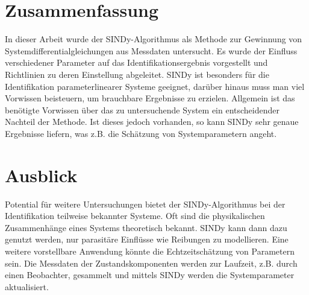 \section{Zusammenfassung}
In dieser Arbeit wurde der SINDy-Algorithmus als Methode zur Gewinnung von Systemdifferentialgleichungen aus Messdaten untersucht. Es wurde der Einfluss verschiedener Parameter auf das Identifikationsergebnis vorgestellt und Richtlinien zu deren Einstellung abgeleitet. SINDy ist besonders für die Identifikation parameterlinearer Systeme geeignet, darüber hinaus muss man viel Vorwissen beisteuern, um brauchbare Ergebnisse zu erzielen. Allgemein ist das benötigte Vorwissen über das zu untersuchende System ein entscheidender Nachteil der Methode. Ist dieses jedoch vorhanden, so kann SINDy sehr genaue Ergebnisse liefern, was z.B. die Schätzung von Systemparametern angeht.

\section{Ausblick}
Potential für weitere Untersuchungen bietet der SINDy-Algorithmus bei der Identifikation teilweise bekannter Systeme. Oft sind die physikalischen Zusammenhänge eines Systems theoretisch bekannt. SINDy kann dann dazu genutzt werden, nur parasitäre Einflüsse wie Reibungen zu modellieren. 
Eine weitere vorstellbare Anwendung könnte die Echtzeitschätzung von Parametern sein. Die Messdaten der Zustandskomponenten werden zur Laufzeit, z.B. durch einen Beobachter, gesammelt und mittels SINDy werden die Systemparameter aktualisiert. 